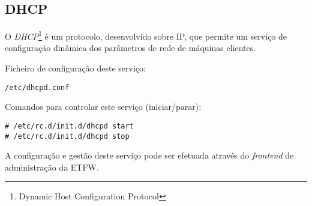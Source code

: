 \subsection{DHCP}

O \emph{DHCP}\footnote{Dynamic Host Configuration Protocol} é um protocolo,
desenvolvido sobre IP, que permite um serviço de configuração dinâmica 
dos parâmetros de rede de máquinas clientes.

Ficheiro de configuração deste serviço:

\begin{Verbatim}[commandchars=\\\{\}]
/etc/dhcpd.conf
\end{Verbatim}

Comandos para controlar este serviço (iniciar/parar):

\begin{Verbatim}[commandchars=\\\{\}]
# /etc/rc.d/init.d/dhcpd start
# /etc/rc.d/init.d/dhcpd stop
\end{Verbatim}

A configuração e gestão deste serviço pode ser efetuada através do \textit{frontend} de administração da ETFW.
